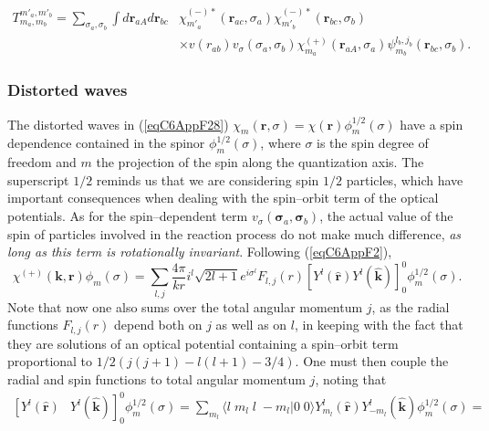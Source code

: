 \begin{subappendices}
\begin{equation}\label{eqC6AppF28}
\begin{split}
T_{m_a,m_b}^{m'_a,m'_b}=\sum_{\sigma_a,\sigma_b}\int d\mathbf{r}_{aA}d \mathbf{r}_{bc}&\chi^{(-)*}_{m'_a}(\mathbf{r}_{ac},\sigma_a)\chi^{(-)*}_{m'_b}(\mathbf{r}_{bc},\sigma_b)\\
&\times v(r_{ab})v_\sigma(\sigma_a,\sigma_b)\chi^{(+)}_{m_a}(\mathbf{r}_{aA},\sigma_a)\psi_{m_b}^{l_b,j_b}(\mathbf{r}_{bc},\sigma_b).
\end{split}
\end{equation}
\subsubsection{Distorted waves}
The distorted waves in (\ref{eqC6AppF28}) $\chi_{m}(\mathbf{r},\sigma)=\chi(\mathbf{r})\phi^{1/2}_m(\sigma)$ have a spin dependence contained in the spinor $\phi^{1/2}_m(\sigma)$, where $\sigma$ is the spin degree of freedom and $m$ the projection of the spin along the quantization axis. The superscript $1/2$ reminds us that we are considering spin $1/2$ particles, which have important consequences when dealing with the spin--orbit term of the optical potentials. As for the spin--dependent term $v_\sigma(\boldsymbol\sigma_a,\boldsymbol\sigma_b)$, the actual value of the spin of  particles involved in the reaction process do not make much difference, \emph{as long as this term is rotationally invariant}. Following (\ref{eqC6AppF2}),
 \begin{equation}\label{eqC6AppG29}
\chi^{(+)}(\mathbf{k},\mathbf{r})\phi_m(\sigma)= \sum_{l,j}\frac{4\pi}{k r} i^{l}\sqrt{2l+1}
e^{i\sigma^{l}} F_{l,j}(r) \left[ Y^{l} (\hat {\mathbf{r}}) Y^{l} (\hat {\mathbf{k}})\right]^0_0\phi^{1/2}_m(\sigma).
\end{equation}
Note that now one  also sums over the total angular momentum $j$, as the radial functions $F_{l,j}(r)$ depend both on $j$ as well as on $l$, in keeping with the fact that they are solutions of an optical potential containing a spin--orbit term proportional to $1/2\left(j(j+1)-l(l+1)-3/4\right)$. One must then couple the radial and spin functions to total angular momentum $j$, noting that 
 \begin{equation}\label{eqC6AppG30}
 \begin{split}
\left[ Y^{l} (\hat {\mathbf{r}}) \right. & \left. Y^{l} (\hat {\mathbf{k}})\right]^0_0\phi^{1/2}_m(\sigma)=\sum_{m_l} \langle l\;m_l\;l\;-m_l|0\;0\rangle Y^{l}_{m_l} (\hat {\mathbf{r}})Y^{l}_{-m_l} (\hat {\mathbf{k}})\phi^{1/2}_m(\sigma)=\\

\end{split}
\end{equation}
\end{subappendices}
